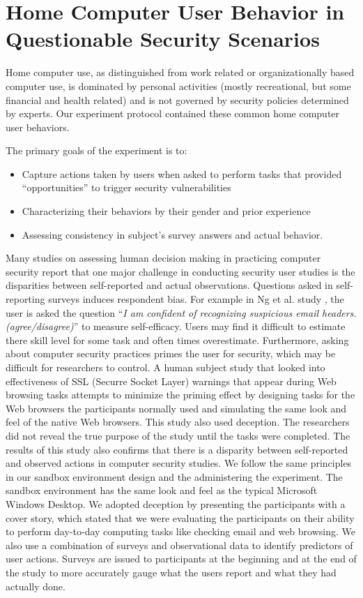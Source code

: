 \documentclass[doctor]{thesis} %
\theoremstyle{plain}
\begin{document}
\section*{Home Computer User Behavior in Questionable Security Scenarios}
Home computer use, as distinguished from work related or organizationally based computer use, is dominated by personal activities (mostly recreational, but some financial and health related) and is not governed by security policies determined by experts. Our experiment protocol contained these common home computer user behaviors.

The primary goals of the experiment is to:
\begin{itemize}
 \item Capture actions taken by users when asked to perform tasks that provided ``opportunities'' to trigger security vulnerabilities
 \item Characterizing their behaviors by their gender and prior experience
 \item Assessing consistency in subject's survey answers and actual behavior.
 \end{itemize}

Many studies on assessing human decision making in practicing computer security  report that one major challenge in conducting security user studies is the disparities between self-reported and actual observations. Questions asked in self-reporting surveys induces respondent bias. For example in Ng et al. study \cite{ng2007}, the user is asked the question ``\textit{I am confident of recognizing suspicious email headers. (agree/disagree)}'' to measure self-efficacy. Users may find it difficult to estimate there skill level for some task and often times overestimate. Furthermore, asking about computer security practices primes the user for security, which may be difficult for researchers to control. A human subject study that looked into effectiveness of SSL (Securre Socket Layer) warnings that appear during Web browsing tasks \cite{sotirakopoulos2011} attempts to minimize the priming effect by designing tasks for the Web browsers the participants normally used and simulating the same look and feel of the native Web browsers. This study also used deception. The researchers did not reveal the true purpose of the study until the tasks were completed. The results of this study also confirms that there is a disparity between self-reported  and observed actions in computer security studies. We follow the same principles in our sandbox environment design and the administering the experiment. The sandbox environment has the same look and feel as the typical Microsoft Windows Desktop. We adopted deception by presenting the participants with a cover story, which stated that we were evaluating the participants on their ability to perform day-to-day computing tasks like checking email and web browsing. We also use a combination of surveys and observational data to identify predictors of user actions. Surveys are issued to participants at the beginning and at the end of the study to more accurately gauge what the users report and what they had actually done.
\end{document}
